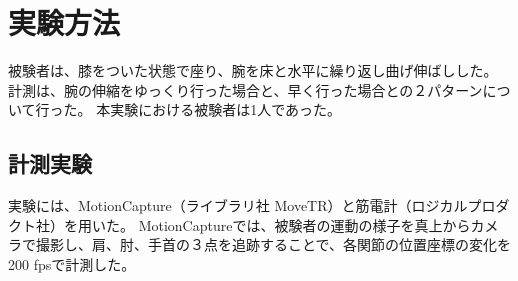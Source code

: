 \documentclass{jsarticle}
\begin{document}
\section{実験方法}
被験者は、膝をついた状態で座り、腕を床と水平に繰り返し曲げ伸ばしした。
計測は、腕の伸縮をゆっくり行った場合と、早く行った場合との２パターンについて行った。
本実験における被験者は1人であった。
                                                                                                                                                                                                                                                                                                                                                                                                                                                                                                                                                                                                                                                                                                                                                                                                                                                                                                                                                                                                                                                                                                                                                                                                                                                                                                                                                                                                                                                                                                                                                                                                                                                                                                                                                                                                                                                                                                                                                                                                                                                                                                                                                   
\subsection{計測実験}
実験には、MotionCapture（ライブラリ社 MoveTR）と筋電計（ロジカルプロダクト社）を用いた。
MotionCaptureでは、被験者の運動の様子を真上からカメラで撮影し、肩、肘、手首の３点を追跡することで、各関節の位置座標の変化を200 fpsで計測した。
\end{document}
